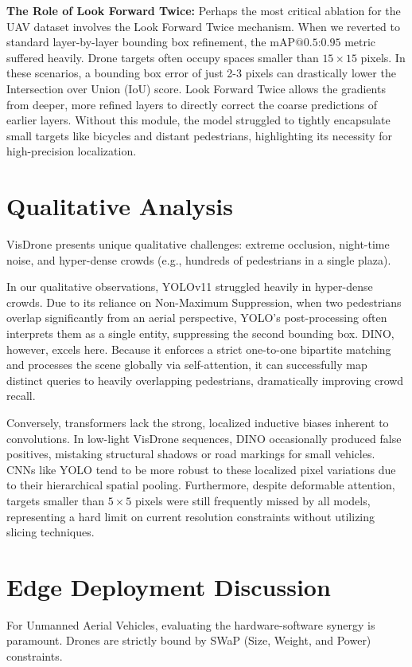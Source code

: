 \documentclass[11pt, conference, onecolumn]{IEEEtran}
\begin{document}
\textbf{The Role of Look Forward Twice:}
Perhaps the most critical ablation for the UAV dataset involves the Look Forward Twice mechanism. When we reverted to standard layer-by-layer bounding box refinement, the $\text{mAP@0.5:0.95}$ metric suffered heavily. Drone targets often occupy spaces smaller than $15 \times 15$ pixels. In these scenarios, a bounding box error of just 2-3 pixels can drastically lower the Intersection over Union (IoU) score. Look Forward Twice allows the gradients from deeper, more refined layers to directly correct the coarse predictions of earlier layers. Without this module, the model struggled to tightly encapsulate small targets like bicycles and distant pedestrians, highlighting its necessity for high-precision localization.

\section{Qualitative Analysis}
VisDrone presents unique qualitative challenges: extreme occlusion, night-time noise, and hyper-dense crowds (e.g., hundreds of pedestrians in a single plaza). 

In our qualitative observations, YOLOv11 struggled heavily in hyper-dense crowds. Due to its reliance on Non-Maximum Suppression, when two pedestrians overlap significantly from an aerial perspective, YOLO's post-processing often interprets them as a single entity, suppressing the second bounding box. DINO, however, excels here. Because it enforces a strict one-to-one bipartite matching and processes the scene globally via self-attention, it can successfully map distinct queries to heavily overlapping pedestrians, dramatically improving crowd recall.

Conversely, transformers lack the strong, localized inductive biases inherent to convolutions. In low-light VisDrone sequences, DINO occasionally produced false positives, mistaking structural shadows or road markings for small vehicles. CNNs like YOLO tend to be more robust to these localized pixel variations due to their hierarchical spatial pooling. Furthermore, despite deformable attention, targets smaller than $5 \times 5$ pixels were still frequently missed by all models, representing a hard limit on current resolution constraints without utilizing slicing techniques.

\section{Edge Deployment Discussion}
For Unmanned Aerial Vehicles, evaluating the hardware-software synergy is paramount. Drones are strictly bound by SWaP (Size, Weight, and Power) constraints. 
\end{document}
